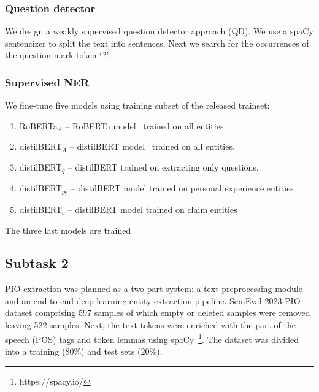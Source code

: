 \documentclass[11pt]{article}
\begin{document}
\subsubsection*{Question detector}


We design a weakly supervised question detector approach (QD).
We use a spaCy sentencizer to split the text into sentences.
Next we search for the occurrences of the question mark token `?'. 



\subsubsection*{Supervised NER}


We fine-tune five models using training subset of the released trainset:

\begin{enumerate}
\item RoBERTa$_A$ -- RoBERTa model~\cite{Liu2019RoBERTaAR} trained on all entities. %
\item distilBERT$_A$ -- distilBERT model~\cite{Sanh2019DistilBERTAD} trained on all entities.  %
\item  distilBERT$_q$ --  distilBERT trained on extracting only questions. %
\item distilBERT$_{pe}$ -- distilBERT model trained on personal experience entities %
\item distilBERT$_c$ -- distilBERT model trained on claim entities %
\end{enumerate}

The three last models are trained 



%
%
%
\subsection{Subtask 2}
\label{system:task2}
%
PIO extraction was planned as a two-part system: a text preprocessing module and an end-to-end deep learning entity extraction pipeline.
SemEval-2023 PIO dataset comprising 597 samples of which empty or deleted samples were removed leaving 522 samples.
Next, the text tokens were enriched with the part-of-the-speech (POS) tags and token lemmas using spaCy~\footnote{https://spacy.io/}.
The dataset was divided into a training (80\%) and test sets (20\%).
\end{document}
